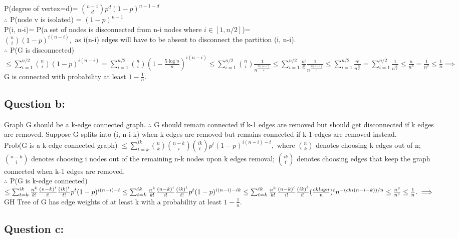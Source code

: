 \documentclass[12pt]{article}
\begin{document}
P(degree of vertex=d)= $ {{n-1} \choose {d} } p^d (1-p)^{n-1-d} $ \\
$\therefore$ P(node v is isolated) = $(1-p)^{n-1}$ \\
P(i, n-i)= P(a set of nodes is disconnected from n-i nodes
where $i \in [1,n/2]$)= \\ ${n \choose i}(1-p)^{i(n-i)},$ as
i(n-i) edges will have to be absent to disconnect the partition 
(i, n-i). \\
$\therefore$ P(G is disconnected) $\le \sum_{i=1}^{n/2} 
{n \choose i}(1-p)^{i(n-i)}=\sum_{i=1}^{n/2} 
{n \choose i}(1- \frac{5\log n}{n})^{i(n-i)} \le
\sum_{i=1}^{n/2} {n \choose i} \frac {1}{n^{\frac{5i(n-i)}{n}}}
\le \sum_{i=1}^{n/2} \frac{n^i}{i!} \frac {1}{n^{\frac{5i(n-i)}{n}}} 
\le \sum_{i=1}^{n/2} \frac{n^i}{n^{\frac{5i}{2}}}
= \sum_{i=1}^{n/2} \frac{1}{n^{\frac{3i}{2}}} \le \frac{n}{n^3}=
\frac{1}{n^2} \le \frac{1}{n} \implies
$ G is connected with probability at least $1-\frac{1}{n}$.

\subsection{Question b:}

Graph G should be a k-edge connected graph. $\therefore$ G 
should remain connected if k-1 edges are removed but should get 
disconnected if k edges are removed. Suppose G splits into
(i, n-i-k) when k edges are removed but remains connected if 
k-1 edges are removed instead. \\
Prob(G is a k-edge connected graph) $\le \sum_{t=k}^{ik}
{n \choose k}{n-k \choose i}{ik \choose t}p^t (1-p)^{i(n-i)-t},$ 
where ${n \choose k}$ denotes choosing k edges out of n;
${n-k \choose i}$ denotes choosing i nodes out of the remaining 
n-k nodes upon k edges removal; ${ik \choose t}$ denotes
choosing edges that keep the graph connected when k-1 edges
are removed. \\
$\therefore$ P(G is k-edge connected) $\le \sum_{t=k}^{ik}
\frac {n^k}{k!} \frac{(n-k)^i}{i!}\frac{(ik)^t}{t!}p^t(1-p)^{i(n-i)-t}
\le \sum_{t=k}^{ik}
\frac {n^k}{k!} \frac{(n-k)^i}{i!}\frac{(ik)^t}{t!}p^t(1-p)^{i(n-i)-ik}
\le \sum_{t=k}^{ik}
\frac {n^k}{k!} \frac{(n-k)^i}{i!}\frac{(ik)^t}{t!}(\frac{cklogn}{n})^tn^{-(cki(n-i-k))/n}
\le \frac {n^2}{n^c} \le \frac {1}{n}. \\
\implies$ GH Tree of G has edge weights of at least k with a 
probability at least $1-\frac{1}{n}.$

\subsection{Question c:}
\end{document}

